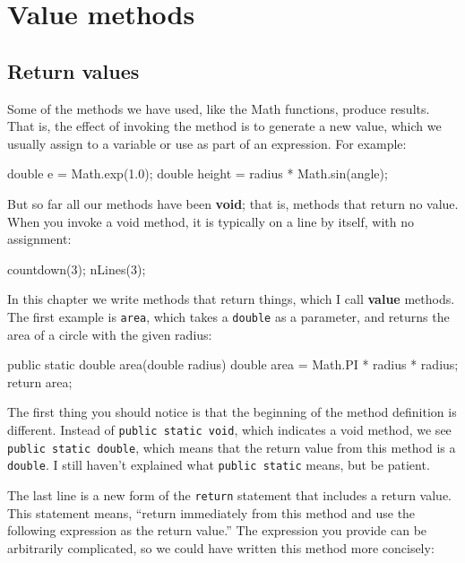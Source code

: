 \chapter{Value methods}
\label{chap05}

\section{Return values}

Some of the methods we have used, like the Math
functions, produce results.  That is, the effect of
invoking the method is to generate a new value, which we
usually assign to a variable or use as part of an expression.
For example:

\begin{code}
    double e = Math.exp(1.0);
    double height = radius * Math.sin(angle);
\end{code}

But so far all our methods have been {\bf void}; that is, methods
that return no value.  When you invoke a void method, it is typically
on a line by itself, with no assignment:

\begin{code}
    countdown(3);
    nLines(3);
\end{code}

In this chapter we write methods that return things, which I call
{\bf value} methods.  The first example is {\tt area}, which takes a
{\tt double} as a parameter, and returns the area of a circle with the
given radius:

\begin{code}
  public static double area(double radius) {
    double area = Math.PI * radius * radius;
    return area;
  }
\end{code}

The first thing you should notice is that the beginning of the
method definition is different.  Instead of {\tt public static
void}, which indicates a void method, we see {\tt public static
double}, which means that the return value from this method
is a {\tt double}.  I still haven't explained what
{\tt public static} means, but be patient.

The last line is a new form of the
{\tt return} statement that includes a return value.  This
statement means, ``return immediately from this method and
use the following expression as the return value.''  The
expression you provide can be arbitrarily complicated,
so we could have written this method more concisely:

